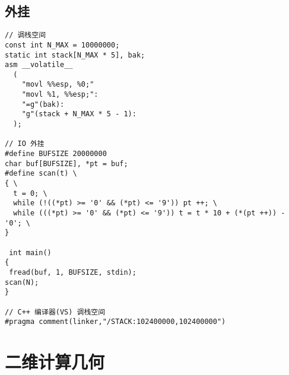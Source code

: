 \subsection{外挂}
\begin{lstlisting}[language={}]
// 调栈空间
const int N_MAX = 10000000;  
static int stack[N_MAX * 5], bak;  
asm __volatile__  
  (  
    "movl %%esp, %0;"  
    "movl %1, %%esp;":   
    "=g"(bak):  
    "g"(stack + N_MAX * 5 - 1):  
  );
  
// IO 外挂
#define BUFSIZE 20000000
char buf[BUFSIZE], *pt = buf;
#define scan(t) \
{ \
  t = 0; \
  while (!((*pt) >= '0' && (*pt) <= '9')) pt ++; \
  while (((*pt) >= '0' && (*pt) <= '9')) t = t * 10 + (*(pt ++)) - '0'; \
}
 
 int main()
{
 fread(buf, 1, BUFSIZE, stdin);
scan(N);
}

// C++ 编译器(VS) 调栈空间
#pragma comment(linker,"/STACK:102400000,102400000")
\end{lstlisting}

\section{二维计算几何}
